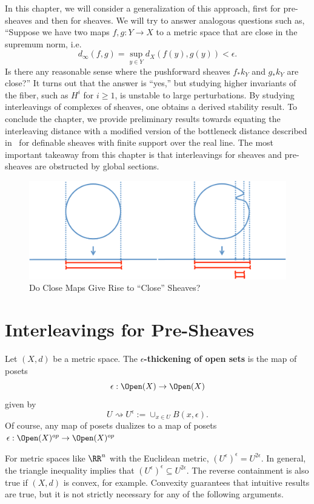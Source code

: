 In this chapter, we will consider a generalization of this approach, first for pre-sheaves and then for sheaves. We will try to answer analogous questions such as, ``Suppose we have two maps $f,g:Y\to X$ to a metric space that are close in the supremum norm, i.e.
\[
d_{\infty}(f,g)=\sup_{y\in Y} d_X(f(y),g(y)) < \epsilon.
\]
Is there any reasonable sense where the pushforward sheaves $f_*k_Y$ and $g_*k_Y$ are close?'' It turns out that the answer is ``yes,'' but studying higher invariants of the fiber, such as $H^i$ for $i\geq 1$, is unstable to large perturbations. By studying interleavings of complexes of sheaves, one obtains a derived stability result. To conclude the chapter, we provide preliminary results towards equating the interleaving distance with a modified version of the bottleneck distance described in~\cite{cohen2007stability} for definable sheaves with finite support over the real line. The most important takeaway from this chapter is that interleavings for sheaves and pre-sheaves are obstructed by global sections.

\begin{figure}
\centering
\includegraphics[width=\textwidth]{perturb.pdf}
\caption{Do Close Maps Give Rise to ``Close'' Sheaves?}
\label{fig:perturb}
\end{figure}

\section{Interleavings for Pre-Sheaves}

\begin{defn}
	Let $(X,d)$ be a metric space. The \textbf{$\epsilon$-thickening of open sets} is the map of posets
	\[
		\epsilon: \Open(X) \to \Open(X)
	\]
	given by
	\[
			U \rightsquigarrow U^{\epsilon}:=\cup_{x\in U} B(x,\epsilon).
	\]
	Of course, any map of posets dualizes to a map of posets $\epsilon:
	\Open(X)^{op}\to\Open(X)^{op}$
\end{defn}
\begin{rmk}
	For metric spaces like $\RR^n$ with the Euclidean metric, $(U^{\epsilon})^{\epsilon}=U^{2\epsilon}$. In general, the triangle inequality implies that $(U^{\epsilon})^{\epsilon}\subseteq U^{2\epsilon}$. The reverse containment is also true if $(X,d)$ is convex, for example. Convexity guarantees that intuitive results are true, but it is not strictly necessary for any of the following arguments.
\end{rmk}

